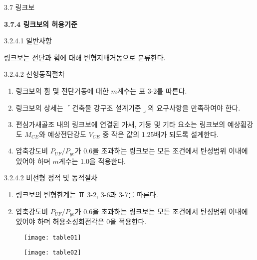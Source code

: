 	\begin{frame}{3.7 링크보}

	\textbf{3.7.4 링크보의 허용기준}
	
	3.2.4.1 일반사항
	
	링크보는 전단과 휨에 대해 변형지배거동으로 분류한다. 
	
	3.2.4.2	선형동적절차
	
	\begin{enumerate}
		\item[(1)] 링크보의 휨 및 전단거동에 대한 $m$계수는 표 3-2를 따른다. 
		\item[(2)] 링크보의 상세는 $\ulcorner$건축물 강구조 설계기준$\lrcorner$의 요구사항을 만족하여야 한다. 
		\item[(3)] 편심가새골조 내의 링크보에 연결된 가새, 기둥 및 기타 요소는 링크보의 예상휨강도 $M_{CE}$와 예상전단강도 $V_{CE}$ 중 작은 값의 1.25배가 되도록 설계한다. 
		\item[(4)] 압축강도비 $P_{UF}/P_{ye}$가 0.6을 초과하는 링크보는 모든 조건에서 탄성범위 이내에 있어야 하며 $m$계수는 1.0을 적용한다.  
	\end{enumerate}
	
	3.2.4.2 비선형 정적 및 동적절차	
	
	\begin{enumerate}
		\item[(1)] 링크보의 변형한계는 표 3-2, 3-6과 3-7를 따른다. 
		\item[(2)] 압축강도비 $P_{UF}/P_{ye}$가 0.6을 초과하는 링크보는 모든 조건에서 탄성범위 이내에 있어야 하며 허용소성회전각은 0을 적용한다. 
	\end{enumerate}
	\end{frame}	

	\begin{frame}
		\begin{figure}
			\centering
			\texttt{[image: table01]}
		\end{figure}
	\end{frame}
	
	\begin{frame}
		\begin{figure}
			\centering
			\texttt{[image: table02]}
		\end{figure}
	\end{frame}	
	
